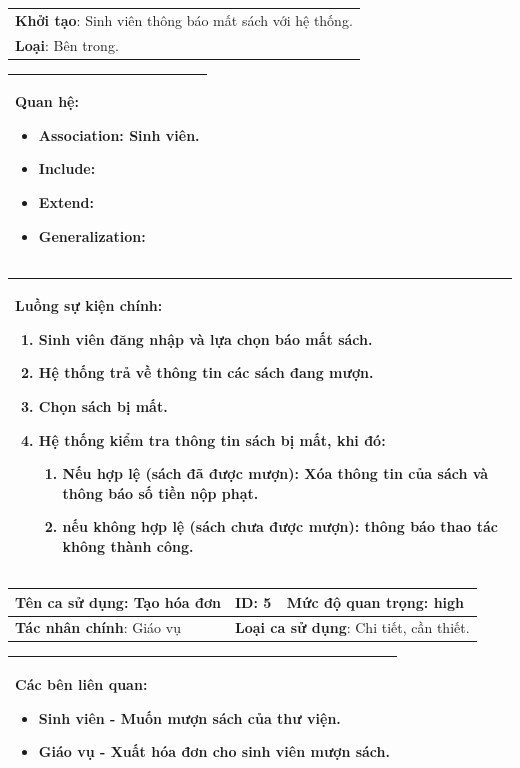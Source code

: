 \documentclass[../report.tex]{subfiles}
\begin{document}
\begin{center}
\begin{tabular}{| m{15.9cm} |}
    \hline
    \textbf{Khởi tạo}: Sinh viên thông báo mất sách với hệ thống. \\
    \textbf{Loại}: Bên trong.  \\
    \hline
\end{tabular}

\begin{tabular}{| m{15.9cm} |}
    \hline
    \textbf{Quan hệ}:
    \begin{itemize}
        \item Association: Sinh viên.
        \item Include: 
        \item Extend: 
        \item Generalization: 
    \end{itemize} \\
    \hline
\end{tabular}

\begin{tabular}{| m{15.9cm} |}
    \hline
    \textbf{Luồng sự kiện chính}:
    \begin{enumerate}
        \item Sinh viên đăng nhập và lựa chọn báo mất sách. 
        \item Hệ thống trả về thông tin các sách đang mượn.
        \item Chọn sách bị mất.
        \item Hệ thống kiểm tra thông tin sách bị mất, khi đó:
        \begin{enumerate}
            \item Nếu hợp lệ (sách đã được mượn): Xóa thông tin của sách và thông báo số tiền nộp phạt.
            \item nếu không hợp lệ (sách chưa được mượn): thông báo thao tác không thành công. 
        \end{enumerate}
    \end{enumerate} \\
    \hline
\end{tabular}

\newpage
\begin{tabular}{| m{6cm} | m{3cm} | m{6cm} |}
    \hline
    \textbf{Tên ca sử dụng}: Tạo hóa đơn & \textbf{ID}: 5 & \textbf{Mức độ quan trọng}: high \\
    \hline
    \textbf{Tác nhân chính}: Giáo vụ  & \multicolumn{2}{|l|}{\textbf{Loại ca sử dụng}: Chi tiết, cần thiết.} \\
    \hline
\end{tabular}
\begin{tabular}{| m{15.9cm} |}
    \hline
        \textbf{Các bên liên quan:} 
        \begin{itemize}
            \item Sinh viên - Muốn mượn sách của thư viện. 
            \item Giáo vụ - Xuất hóa đơn cho sinh viên mượn sách. 
        \end{itemize} \\
    \hline
\end{tabular}


\end{center}
\end{document}
